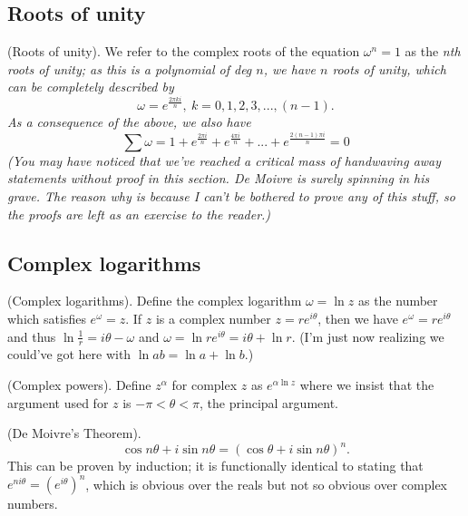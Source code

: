 \documentclass{article}
\begin{document}
\subsection{Roots of unity}
\begin{definition}
    (Roots of unity). We refer to the complex roots of the equation $\omega^n=1$ as the \it nth roots of unity\normalfont ; as this is a polynomial of deg $n$, we have $n$ roots of unity, which can be completely described by 
    \begin{equation*}
        \omega=e^{\frac{2\pi ki}{n}},\ k=0,1,2,3,...,(n-1).
    \end{equation*}
    As a consequence of the above, we also have 
    \begin{equation*}
        \sum \omega = 1+e^{\frac{2\pi i}{n}} + e^{\frac{4\pi i}{n}} + ... + e^{\frac{2(n-1)\pi i}{n}} = 0
    \end{equation*}
    (You may have noticed that we've reached a critical mass of handwaving away statements without proof in this section. De Moivre is surely spinning in his grave. The reason why is because I can't be bothered to prove any of this stuff, so the proofs are left as an exercise to the reader.)
\end{definition}
\subsection{Complex logarithms}
\begin{definition}
    (Complex logarithms). Define the complex logarithm $\omega = \ln z$ as the number which satisfies $e^\omega = z$. If $z$ is a complex number $z=re^{i\theta}$, then we have $e^{\omega} = re^{i\theta}$ and thus $\ln \frac{1}{r} = i\theta - \omega$ and $\omega = \ln re^{i\theta} = i\theta +\ln r$. (I'm just now realizing we could've got here with $\ln ab = \ln a + \ln b$.)
\end{definition}
\begin{definition}
    (Complex powers). Define $z^\alpha$ for complex $z$ as $e^{\alpha\ln z}$ where we insist that the argument used for $z$ is $-\pi < \theta < \pi$, the principal argument.
\end{definition}
\begin{definition}
    (De Moivre's Theorem).
    \begin{equation*}
        \cos n\theta + i\sin n\theta =(\cos \theta + i\sin n\theta)^n.
    \end{equation*}
    This can be proven by induction; it is functionally identical to stating that $e^{ni\theta}=(e^{i\theta})^n$, which is obvious over the reals but not so obvious over complex numbers.
\end{definition}
\end{document}
